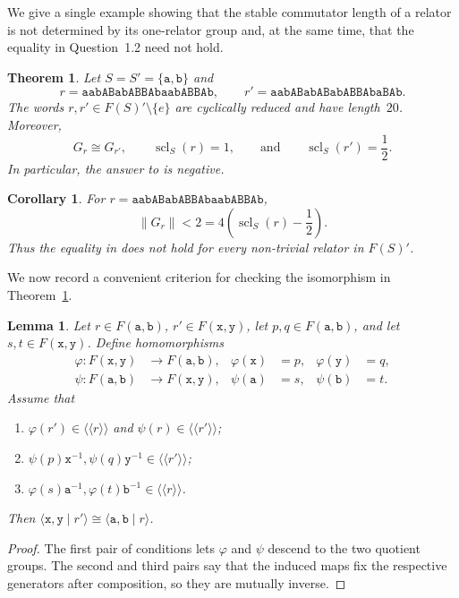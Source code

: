 \documentclass[12pt,a4paper,oneside]{amsart}
\DeclareMathOperator{\scl}{scl}
\newcommand{\nc}[1]{\langle\!\langle #1 \rangle\!\rangle}
\newcommand{\genrel}[2]{\langle #1 \mid #2 \rangle}
\theoremstyle{plain}
\newtheorem{theoremA}{Theorem}
\newtheorem{lemma}[theorem]{Lemma}
\newtheorem{corollary}[theorem]{Corollary}
\theoremstyle{definition}
\begin{document}
We give a single example showing that the stable commutator length of a relator is not determined by its one-relator group and, at the same time, that the equality in Question~1.2 need not hold.

\begin{theoremA}\label{thm:main}
Let \(S=S'=\{\mathtt a,\mathtt b\}\) and
\[
  r=\mathtt{aabABabABBAbaabABBAb},\qquad
  r'=\mathtt{aabABabABabABBAbaBAb}.
\]
The words \(r,r'\in F(S)'\setminus\{e\}\) are cyclically reduced and have length~\(20\). Moreover,
\[
  G_r\cong G_{r'},\qquad \scl_S(r)=1,
  \qquad\text{and}\qquad \scl_S(r')=\frac12.
\]
In particular, the answer to \cite[Question~1.3(1)]{HeuerLoeh2022} is negative.
\end{theoremA}

\begin{corollary}\label{cor:simvol}
For \(r=\mathtt{aabABabABBAbaabABBAb}\),
\[
  \lVert G_r\rVert<2
  =4\left(\scl_S(r)-\frac12\right).
\]
Thus the equality in \cite[Question~1.2]{HeuerLoeh2022} does not hold for every non-trivial relator in \(F(S)'\).
\end{corollary}

We now record a convenient criterion for checking the isomorphism in Theorem~\ref{thm:main}.

\begin{lemma}\label{lem:cert}
Let \(r\in F(\mathtt a,\mathtt b)\), \(r'\in F(\mathtt x,\mathtt y)\), let \(p,q\in F(\mathtt a,\mathtt b)\), and let \(s,t\in F(\mathtt x,\mathtt y)\). Define homomorphisms
\[
\begin{aligned}
  \varphi\colon F(\mathtt x,\mathtt y)&\longrightarrow F(\mathtt a,\mathtt b),
  &\varphi(\mathtt x)&=p,&\varphi(\mathtt y)&=q,\\
  \psi\colon F(\mathtt a,\mathtt b)&\longrightarrow F(\mathtt x,\mathtt y),
  &\psi(\mathtt a)&=s,&\psi(\mathtt b)&=t.
\end{aligned}
\]
Assume that
\begin{enumerate}
  \item \(\varphi(r')\in\nc r\) and \(\psi(r)\in\nc{r'}\);
  \item \(\psi(p)\mathtt x^{-1},\psi(q)\mathtt y^{-1}\in\nc{r'}\);
  \item \(\varphi(s)\mathtt a^{-1},\varphi(t)\mathtt b^{-1}\in\nc r\).
\end{enumerate}
Then \(\genrel{\mathtt{x,y}}{r'}\cong\genrel{\mathtt{a,b}}r\).
\end{lemma}

\begin{proof}
The first pair of conditions lets \(\varphi\) and \(\psi\) descend to the two quotient groups. The second and third pairs say that the induced maps fix the respective generators after composition, so they are mutually inverse.
\end{proof}
\end{document}
